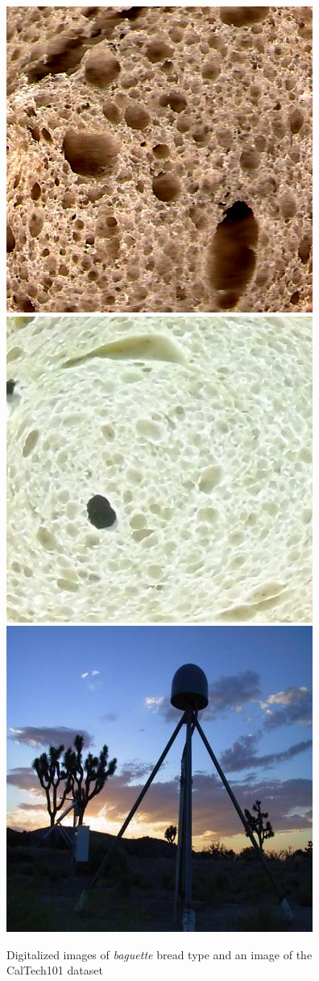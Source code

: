 \documentclass[a4paper,10pt]{article}
\begin{document}
\begin{figure}[htb]
\centering
\includegraphics[scale=1.37]{images/baguette20}
\includegraphics[scale=1.36]{images/b16}
\includegraphics[scale=0.28]{images/image_0300}
\caption{Digitalized images of {\em baguette} bread type and an image of the CalTech101 dataset}
\label{fig:imagedatabase}
\end{figure}
\end{document}
